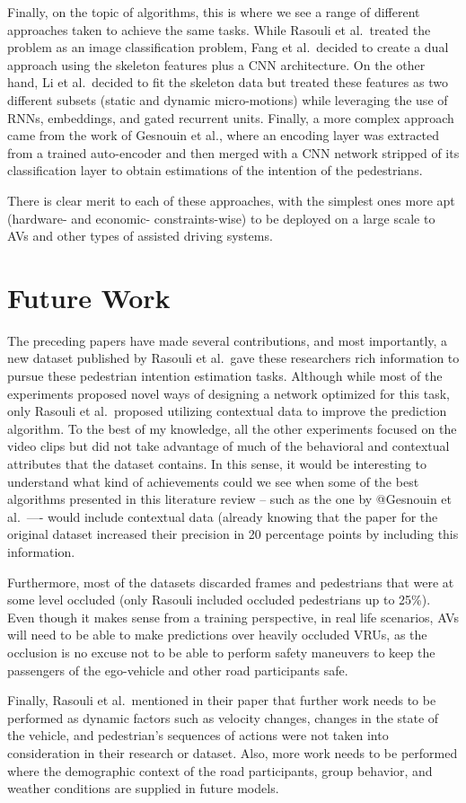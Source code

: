 \documentclass[
]{article}
\begin{document}
Finally, on the topic of algorithms, this is where we see a range of
different approaches taken to achieve the same tasks. While Rasouli et
al.~treated the problem as an image classification problem, Fang et
al.~decided to create a dual approach using the skeleton features plus a
CNN architecture. On the other hand, Li et al.~decided to fit the
skeleton data but treated these features as two different subsets
(static and dynamic micro-motions) while leveraging the use of RNNs,
embeddings, and gated recurrent units. Finally, a more complex approach
came from the work of Gesnouin et al., where an encoding layer was
extracted from a trained auto-encoder and then merged with a CNN network
stripped of its classification layer to obtain estimations of the
intention of the pedestrians.

There is clear merit to each of these approaches, with the simplest ones
more apt (hardware- and economic- constraints-wise) to be deployed on a
large scale to AVs and other types of assisted driving systems.

\hypertarget{future-work}{%
\section{Future Work}\label{future-work}}

The preceding papers have made several contributions, and most
importantly, a new dataset published by Rasouli et al.~gave these
researchers rich information to pursue these pedestrian intention
estimation tasks. Although while most of the experiments proposed novel
ways of designing a network optimized for this task, only Rasouli et
al.~proposed utilizing contextual data to improve the prediction
algorithm. To the best of my knowledge, all the other experiments
focused on the video clips but did not take advantage of much of the
behavioral and contextual attributes that the dataset contains. In this
sense, it would be interesting to understand what kind of achievements
could we see when some of the best algorithms presented in this
literature review -- such as the one by @Gesnouin et al.~---- would
include contextual data (already knowing that the paper for the original
dataset increased their precision in 20 percentage points by including
this information.

Furthermore, most of the datasets discarded frames and pedestrians that
were at some level occluded (only Rasouli included occluded pedestrians
up to 25\%). Even though it makes sense from a training perspective, in
real life scenarios, AVs will need to be able to make predictions over
heavily occluded VRUs, as the occlusion is no excuse not to be able to
perform safety maneuvers to keep the passengers of the ego-vehicle and
other road participants safe.

Finally, Rasouli et al.~mentioned in their paper that further work needs
to be performed as dynamic factors such as velocity changes, changes in
the state of the vehicle, and pedestrian's sequences of actions were not
taken into consideration in their research or dataset. Also, more work
needs to be performed where the demographic context of the road
participants, group behavior, and weather conditions are supplied in
future models.
\end{document}
